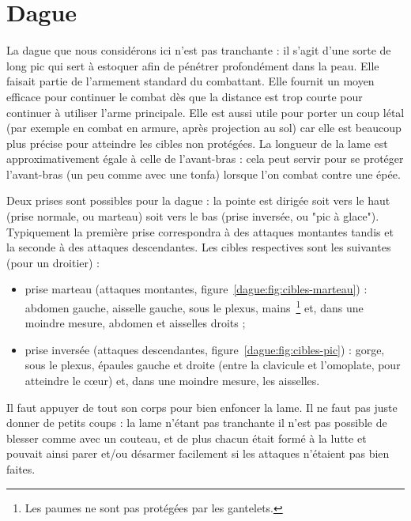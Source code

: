 \chapter{Dague}


La dague que nous considérons ici n'est pas tranchante : il s'agit d'une sorte de long pic qui sert à estoquer afin de pénétrer profondément dans la peau.
Elle faisait partie de l'armement standard du combattant.
Elle fournit un moyen efficace pour continuer le combat dès que la distance est trop courte pour continuer à utiliser l'arme principale.
Elle est aussi utile pour porter un coup létal (par exemple en combat en armure, après projection au sol) car elle est beaucoup plus précise pour atteindre les cibles non protégées.
La longueur de la lame est approximativement égale à celle de l'avant-bras : cela peut servir pour se protéger l'avant-bras (un peu comme avec une tonfa) lorsque l'on combat contre une épée.

Deux prises sont possibles pour la dague : la pointe est dirigée soit vers le haut (prise normale, ou marteau) soit vers le bas (prise inversée, ou "pic à glace").
Typiquement la première prise correspondra à des attaques montantes tandis et la seconde à des attaques descendantes.
Les cibles respectives sont les suivantes (pour un droitier) :
\begin{itemize}
	\item prise marteau (attaques montantes, figure~\ref{dague:fig:cibles-marteau}) : abdomen gauche, aisselle gauche, sous le plexus, mains~\footnote{Les paumes ne sont pas protégées par les gantelets.} et, dans une moindre mesure, abdomen et aisselles droits ;
	\item prise inversée (attaques descendantes, figure~\ref{dague:fig:cibles-pic}) : gorge, sous le plexus, épaules gauche et droite (entre la clavicule et l'omoplate, pour atteindre le cœur) et, dans une moindre mesure, les aisselles.
\end{itemize}
Il faut appuyer de tout son corps pour bien enfoncer la lame.
Il ne faut pas juste donner de petits coups : la lame n'étant pas tranchante il n'est pas possible de blesser comme avec un couteau, et de plus chacun était formé à la lutte et pouvait ainsi parer et/ou désarmer facilement si les attaques n'étaient pas bien faites.


